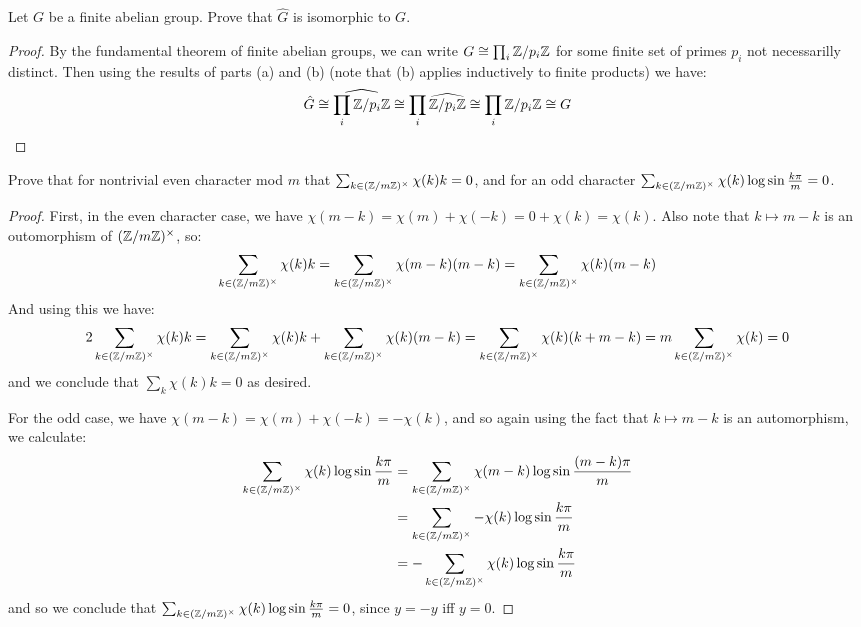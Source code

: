 \documentclass[11pt]{article}
\begin{document}
Let $G$ be a finite abelian group. Prove that $\hat G$ is isomorphic to $G$.
\begin{proof}
  By the fundamental theorem of finite abelian groups, we can write $G \cong \prod_i \mathbb{Z}/p_i\mathbb{Z}$ for some finite set of primes $p_i$ not necessarilly distinct.
  Then using the results of parts (a) and (b) (note that (b) applies inductively to finite products) we have:
  \begin{equation*}
    \hat{G}
    \cong \widehat{\prod_i \mathbb{Z}/p_i\mathbb{Z}}
    \cong \prod_i \widehat{\mathbb{Z}/p_i\mathbb{Z}}
    \cong \prod_i \mathbb{Z}/p_i\mathbb{Z} \cong G
  \end{equation*}
\end{proof}


Prove that for nontrivial even character mod $m$ that $\sum_{k \in (\mathbb{Z}/m\mathbb{Z})^\times} \chi(k) k = 0$, and for an odd character $\sum_{k \in (\mathbb{Z}/m\mathbb{Z})^\times} \chi(k) \log \sin \frac{k\pi}{m} = 0$.
\begin{proof}
  First, in the even character case, we have $\chi(m-k) = \chi(m) + \chi(-k) = 0 + \chi(k) = \chi(k)$.
  Also note that $k \mapsto m - k$ is an outomorphism of $(\mathbb{Z}/m\mathbb{Z})^\times$, so:
  \begin{equation*}
    \sum_{k \in (\mathbb{Z}/m\mathbb{Z})^\times} \chi(k) k = \sum_{k \in (\mathbb{Z}/m\mathbb{Z})^\times} \chi(m - k)(m-k) = \sum_{k \in (\mathbb{Z}/m\mathbb{Z})^\times} \chi(k)(m-k)
  \end{equation*}
  And using this we have:
  \begin{equation*}
    2\sum_{k \in (\mathbb{Z}/m\mathbb{Z})^\times} \chi(k) k
    = \sum_{k \in (\mathbb{Z}/m\mathbb{Z})^\times} \chi(k) k + \sum_{k \in (\mathbb{Z}/m\mathbb{Z})^\times} \chi(k) (m-k)
    = \sum_{k \in (\mathbb{Z}/m\mathbb{Z})^\times} \chi(k) (k + m - k)
    = m\sum_{k \in (\mathbb{Z}/m\mathbb{Z})^\times} \chi(k)
    = 0
  \end{equation*}
  and we conclude that $\sum_k \chi(k) k = 0$ as desired.

  For the odd case, we have $\chi(m - k) = \chi(m) + \chi(-k) = -\chi(k)$, and so again using the fact that $k \mapsto m - k$ is an automorphism, we calculate:
  \begin{align*}
    \sum_{k \in (\mathbb{Z}/m\mathbb{Z})^\times} \chi(k) \log \sin \frac{k\pi}{m} 
    &= \sum_{k \in (\mathbb{Z}/m\mathbb{Z})^\times} \chi(m-k) \log \sin \frac{(m-k)\pi}{m} \\
    &= \sum_{k \in (\mathbb{Z}/m\mathbb{Z})^\times} -\chi(k) \log \sin \frac{k\pi}{m} \\
    &= - \sum_{k \in (\mathbb{Z}/m\mathbb{Z})^\times} \chi(k) \log \sin \frac{k\pi}{m} 
  \end{align*}
  and so we conclude that $\sum_{k \in (\mathbb{Z}/m\mathbb{Z})^\times} \chi(k) \log \sin \frac{k\pi}{m} = 0$, since $y = -y$ iff $y = 0$.
\end{proof}
\end{document}
